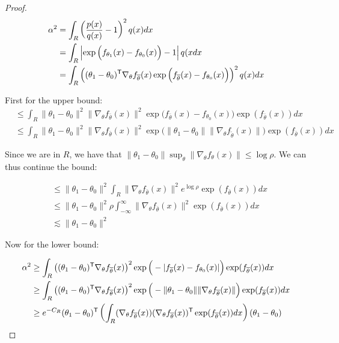 \begin{proof}

\begin{align*}
\alpha^2 &= \int_R \left( \frac{p(x)}{q(x)} - 1 \right)^2 q(x) dx \\
 &= \int_{R} \left| \exp\Big( f_{\theta_1}(x) - f_{\theta_0}(x) \Big) - 1 \right| 
            q(x dx \\
 &= \int_{R} \left( (\theta_1 - \theta_0)^{\mathsf{T}} \nabla_{\theta} f_{\overline{\theta}}(x) 
                            \exp\Big( f_{\overline{\theta}}(x) - f_{\theta_0}(x) \Big) \right)^2 q(x) 
             dx 
\end{align*}

First for the upper bound:
\begin{align*}
& \leq \int_{R} \| \theta_1 - \theta_0 \|^2 \| \nabla_{\theta} f_{\bar{\theta}}(x)\|^2
                            \exp\Big( f_{\bar{\theta}}(x) - f_{\theta_0}(x) \Big)
              \exp( f_{\bar{\theta}}(x) ) dx\\
& \leq  \int_{R} \| \theta_1 - \theta_0 \|^2 \| \nabla_{\theta} f_{\bar{\theta}}(x)\|^2
                            \exp\Big( \| \theta_1 - \theta_0\| \|\nabla_{\theta} f_{\tilde{\theta}}(x) \| \Big) 
              \exp( f_{\bar{\theta}}(x) ) dx
\end{align*}

Since we are in $R$, we have that $\| \theta_1 - \theta_0\| \sup_\theta \| \nabla_\theta f_{\theta}(x) \| \leq \log \rho$. We can thus continue the bound:

\begin{align*}
& \leq   \| \theta_1 - \theta_0 \|^2 \int_{R} \| \nabla_{\theta} f_{\bar{\theta}}(x)\|^2
                           e^{\log \rho}
              \exp( f_{\bar{\theta}}(x) ) dx\\
& \leq  \| \theta_1 - \theta_0 \|^2 \rho \int_{-\infty}^\infty \| \nabla_{\theta} f_{\bar{\theta}}(x)\|^2
              \exp( f_{\bar{\theta}}(x) ) dx \\
& \lesssim \| \theta_1 - \theta_0 \|^2
\end{align*}

Now for the lower bound:

\begin{align*}
\alpha^2 &\geq  \int_{R} \left( (\theta_1 - \theta_0)^{\mathsf{T}} \nabla_{\theta} f_{\overline{\theta}}(x) \right)^2
                            \exp\Big( - |f_{\overline{\theta}}(x) - f_{\theta_0}(x)| \Big)  \exp(f_{\overline{\theta}}(x))
             dx \\
  &\geq \int_{R} \left( (\theta_1 - \theta_0)^{\mathsf{T}} \nabla_{\theta} f_{\overline{\theta}}(x) \right)^2
                            \exp\Big( - \|\theta_1 - \theta_0\| \| \nabla_{\theta} f_{\overline{\theta}}(x) \| \Big)  
          \exp(f_{\overline{\theta}}(x)) dx \\
  &\geq e^{- C_R}  (\theta_1 - \theta_0)^{\mathsf{T}} 
                \left( \int_{R} ( \nabla_{\theta} f_{\overline{\theta}}(x) ) 
                                      ( \nabla_{\theta} f_{\overline{\theta}}(x) )^{\mathsf{T}}
                          \exp(f_{\overline{\theta}}(x)) dx \right) (\theta_1 - \theta_0)
\end{align*}


\end{proof}
